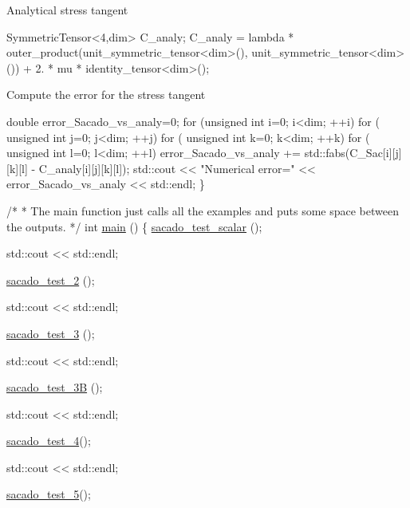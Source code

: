 Analytical stress tangent 
\begin{DoxyCode}
SymmetricTensor<4,dim> C\_analy;
C\_analy = lambda * outer\_product(unit\_symmetric\_tensor<dim>(), unit\_symmetric\_tensor<dim>()) + 2. * mu * 
      identity\_tensor<dim>();
\end{DoxyCode}
 Compute the error for the stress tangent 
\begin{DoxyCode}
     \textcolor{keywordtype}{double} error\_Sacado\_vs\_analy=0;
     \textcolor{keywordflow}{for} (\textcolor{keywordtype}{unsigned} \textcolor{keywordtype}{int} i=0; i<dim; ++i)
        \textcolor{keywordflow}{for} ( \textcolor{keywordtype}{unsigned} \textcolor{keywordtype}{int} j=0; j<dim; ++j)
            \textcolor{keywordflow}{for} ( \textcolor{keywordtype}{unsigned} \textcolor{keywordtype}{int} k=0; k<dim; ++k)
                \textcolor{keywordflow}{for} ( \textcolor{keywordtype}{unsigned} \textcolor{keywordtype}{int} l=0; l<dim; ++l)
                    error\_Sacado\_vs\_analy += std::fabs(C\_Sac[i][j][k][l] - C\_analy[i][j][k][l]);
     std::cout << \textcolor{stringliteral}{"Numerical error="} << error\_Sacado\_vs\_analy << std::endl;
\}
 
 
 
\textcolor{comment}{/*}
\textcolor{comment}{ * The main function just calls all the examples and puts some space between the outputs.}
\textcolor{comment}{ */}
\textcolor{keywordtype}{int} \hyperlink{Sacado__example_8cc_ae66f6b31b5ad750f1fe042a706a4e3d4}{main} ()
\{
    \hyperlink{Sacado__example_8cc_a71b2675e62203edc430e7ffc8a365193}{sacado\_test\_scalar} ();
 
    std::cout << std::endl;
 
    \hyperlink{Sacado__example_8cc_a8ef4ff1e9526ca8451cdcd1678366d2c}{sacado\_test\_2} ();
 
    std::cout << std::endl;
 
    \hyperlink{Sacado__example_8cc_ae45e1df0eec246dbb6f2c3d28a2a58e4}{sacado\_test\_3} ();
 
    std::cout << std::endl;
 
    \hyperlink{Sacado__example_8cc_ae63cc8526935cb0512668e83cfc7b929}{sacado\_test\_3B} ();
 
    std::cout << std::endl;
 
    \hyperlink{Sacado__example_8cc_a2f4def4563e31d720e07bc7d6363ebe2}{sacado\_test\_4}();
 
    std::cout << std::endl;
 
    \hyperlink{Sacado__example_8cc_a327dbbb4ea7fc9840c46d149843a44c2}{sacado\_test\_5}();
 

\end{DoxyCode}
